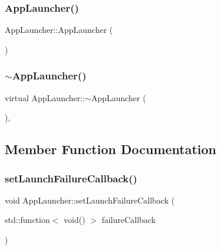 \subsubsection{\texorpdfstring{App\+Launcher()}{AppLauncher()}}
{\footnotesize\ttfamily App\+Launcher\+::\+App\+Launcher (\begin{DoxyParamCaption}{ }\end{DoxyParamCaption})\hspace{0.3cm}{\ttfamily [inline]}}

\mbox{\label{classAppLauncher_a6ff63c24e2e4f4c73ea94ac87ccc29c3}} 
\subsubsection{\texorpdfstring{$\sim$\+App\+Launcher()}{~AppLauncher()}}
{\footnotesize\ttfamily virtual App\+Launcher\+::$\sim$\+App\+Launcher (\begin{DoxyParamCaption}{ }\end{DoxyParamCaption})\hspace{0.3cm}{\ttfamily [inline]}, {\ttfamily [virtual]}}



\subsection{Member Function Documentation}
\mbox{\label{classAppLauncher_a6e5945c8a308b81109429d005792bde6}} 
\subsubsection{\texorpdfstring{set\+Launch\+Failure\+Callback()}{setLaunchFailureCallback()}}
{\footnotesize\ttfamily void App\+Launcher\+::set\+Launch\+Failure\+Callback (\begin{DoxyParamCaption}\item[{std\+::function$<$ void() $>$}]{failure\+Callback }\end{DoxyParamCaption})\hspace{0.3cm}{\ttfamily [inline]}}

